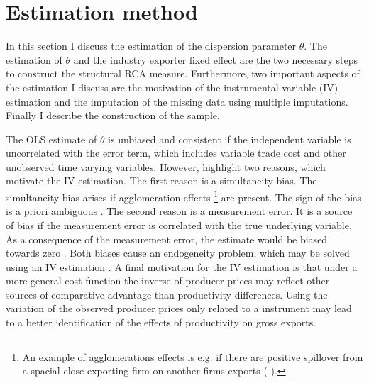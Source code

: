 \section{Estimation method}
In this section I discuss the estimation of the dispersion parameter $\theta$.
The estimation of $\theta$ and the industry exporter fixed effect are the two necessary steps  to construct the structural RCA measure.
Furthermore, two important aspects of the estimation I discuss are the motivation of the instrumental variable (IV) estimation and the imputation of the missing data using multiple imputations.
Finally I describe the construction of the sample.
\par %
The OLS estimate of $\theta$ is unbiased  and consistent if the independent variable is uncorrelated with the error term, which includes variable trade cost and other unobserved time varying variables.
However, \textcite{costinot} highlight two reasons, which motivate the IV estimation.
The first reason is a simultaneity bias.
The simultaneity bias arises if agglomeration effects \footnote{An example of agglomerations effects is e.g. if there are positive spillover from a spacial close exporting firm on another firms exports (\cite{bernard2004} ).} are present.
The sign of the bias is a priori ambiguous \parencite{costinot}.
The second reason is a measurement error.
It is a source of bias if the measurement error is correlated with the true underlying variable.
As a consequence of the measurement error, the estimate would be biased towards zero \parencite[p.85]{greene}.
Both biases cause an endogeneity problem, which may be solved using an IV estimation  \parencite[p.139]{Dhaene}.
A final motivation for the IV estimation is that under a more general cost function the inverse of producer prices may reflect other sources of comparative advantage than productivity differences.
Using the variation of the observed producer prices only related to a instrument may lead to a better identification of the effects of productivity on gross exports.
